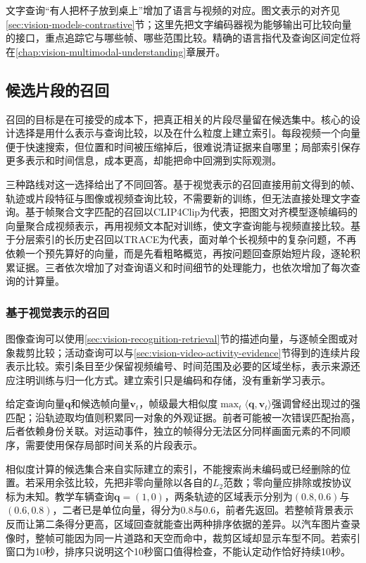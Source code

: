文字查询“有人把杯子放到桌上”增加了语言与视频的对应。图文表示的对齐见\ref{sec:vision-models-contrastive}节；这里先把文字编码器视为能够输出可比较向量的接口，重点追踪它与哪些帧、哪些范围比较。精确的语言指代及查询区间定位将在\ref{chap:vision-multimodal-understanding}章展开。

\subsection{候选片段的召回}
\label{sec:vision-video-candidates}

召回的目标是在可接受的成本下，把真正相关的片段尽量留在候选集中。核心的设计选择是用什么表示与查询比较，以及在什么粒度上建立索引。每段视频一个向量便于快速搜索，但位置和时间被压缩掉后，很难说清证据来自哪里；局部索引保存更多表示和时间信息，成本更高，却能把命中回溯到实际观测。

三种路线对这一选择给出了不同回答。基于视觉表示的召回直接用前文得到的帧、轨迹或片段特征与图像或视频查询比较，不需要新的训练，但无法直接处理文字查询。基于帧聚合文字匹配的召回以CLIP4Clip为代表，把图文对齐模型逐帧编码的向量聚合成视频表示，再用视频文本配对训练，使文字查询能与视频直接比较。基于分层索引的长历史召回以TRACE为代表，面对单个长视频中的复杂问题，不再依赖一个预先算好的向量，而是先看粗略概览，再按问题回查原始短片段，逐轮积累证据。三者依次增加了对查询语义和时间细节的处理能力，也依次增加了每次查询的计算量。

\subsubsection{基于视觉表示的召回}
\label{sec:vision-video-visual-matching}

图像查询可以使用\ref{sec:vision-recognition-retrieval}节的描述向量，与逐帧全图或对象裁剪比较；活动查询可以与\ref{sec:vision-video-activity-evidence}节得到的连续片段表示比较。索引条目至少保留视频编号、时间范围及必要的区域坐标，表示来源还应注明训练与归一化方式。建立索引只是编码和存储，没有重新学习表示。

给定查询向量$\bm{q}$和候选帧向量$\bm{v}_t$，帧级最大相似度$\max_t\langle\bm{q},\bm{v}_t\rangle$强调曾经出现过的强匹配；沿轨迹取均值则积累同一对象的外观证据。前者可能被一次错误匹配抬高，后者依赖身份关联。对运动事件，独立的帧得分无法区分同样画面元素的不同顺序，需要使用保存局部时间关系的片段表示。

相似度计算的候选集合来自实际建立的索引，不能搜索尚未编码或已经删除的位置。若采用余弦比较，先把非零向量除以各自的$L_2$范数；零向量应排除或按协议标为未知。教学车辆查询$\bm{q}=(1,0)$，两条轨迹的区域表示分别为$(0.8,0.6)$与$(0.6,0.8)$，二者已是单位向量，得分为0.8与0.6，前者先返回。若整帧背景表示反而让第二条得分更高，区域回查就能查出两种排序依据的差异。以汽车图片查录像时，整帧可能因为同一片道路和天空而命中，裁剪区域却显示车型不同。若索引窗口为10秒，排序只说明这个10秒窗口值得检查，不能认定动作恰好持续10秒。

